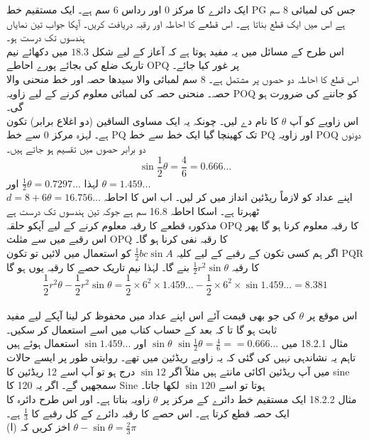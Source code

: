 ایک دائرے کا مرکز 0 اور رداس 6 سم ہے۔ ایک مستقیم خط
PG
جس کی لمبائی 8 سم ہے اس میں ایک قطع بناتا ہے۔ اس قطعے کا احاطہ اور رقبہ دریافت کریں۔ آپکا جواب تین نمایاں ہندسوں تک درست ہو۔\\
اس طرح کے مسائل میں یہ مفید ہوتا ہے کہ آعاز کے لیے شکل
\(18.3\)
میں دکھائے نیم تاریک ضلع کی بجائے پورے احاطے
OPQ
پر غور کیا جائے۔\\
اس قطع کا احاطہ دو حصوں پر مشتمل ہے۔
8 سم لمبائی والا سیدھا حصہ اور خط منحنی والا حصہ۔ منحنی حصہ کی لمبائی معلوم کرنے کے لیے زاویہ
POQ
کو جاننے کی ضرورت ہو گی۔\\
اس زاویے کو آپ
\(\theta\)
کا نام دے لیں۔ چونکہ یہ ایک مساوی الساقین (دو اغلاع برابر) تکون ہے۔ لہزہ مرکز 0 سے خط 
PQ
تک کھینچا گیا ایک خط سے خط 
PQ
اور زاویہ 
POQ
دونوں دو برابر حصوں میں تقسیم ہو جاتے ہیں۔ 
\[\sin\frac{1}{2}\theta=\frac{4}{6}=0.666...\]
لہذا 
\(\frac{1}{2}\theta=0.7297...\)
اور 
\(\theta=1.459...\)
\\اپنے عداد کو لازماً ریڈئین انداز میں کر لیں۔ 
اب اس کا احاطہ 
\(d=8+6\theta=16.756...\)
ٹھہرتا ہے۔ 
اسکا احاطہ 16.8 سم ہے جوکہ تین ہندسوں تک درست ہے\\
مذکورہ قطعے کا رقبہ معلوم کرنے کے لیے آپکو حلقہ 
OPQ
کا رقبہ معلوم کرنا ہو گا 
پھر اس رقبے میں سے مثلث 
OPQ
کا رقبہ نفی کرنا ہو گا۔ \\
اگر ہم کسی تکون کے رقبے کے لیے کلیہ 
\(\frac{1}{2}bc\sin A\)
کو استعمال میں لائیں تو تکون 
PQR
کا رقبہ 
\(\frac{1}{2}r^2\sin\theta\)
بنے گا۔ لہٰذا نیم تاریک حصے کا رقبہ یوں ہو گا 
\[\frac{1}{2}r^2\theta-\frac{1}{2}r^2\sin\theta=\frac{1}{2}\times6^2\times1.459...-\frac{1}{2}\times6^2\times\sin1.459...=8.381\]\\
اس موقع پر 
\(\theta\)
کی جو بھی قیمت آئے اس اپنے عداد میں محفوظ کر لینا آپکے لیے مفید ثابت ہو گا تا کہ بعد کے حساب کتاب میں اسے استعمال کر سکیں۔ \\
مثال 18.2.1 میں 
\(\sin\frac{1}{2}\theta=\frac{4}{6}==0.666...\)
\(\sin\theta\)
اور 
\(\sin1.459...\)
استعمال ہوئے ہیں تاہم یہ نشاندہی نہیں کی گئی کہ یہ زاویے ریڈئین میں تھے۔ روایتی طور پر ایسے حالات میں آپ ریڈئین اکائی مانتے ہیں مثلاً اگر 
\(\sin12\)
درج ہو تو آپ اسے 12 ریڈئین کا 
sine
سمجھیں گے۔ اگر یہ 120 کا 
Sine
ہوتا تو اسے 
\(\sin120\)
لکھا جاتا۔ \\
مثال 18.2.2
ایک مستقیم خط دائرے کے مرکز پر 
\(\theta\)
زاویہ بناتا ہے۔ اور اس طرح دائرہ کا ایک حصہ قطع کرتا ہے۔ اس حصے کا رقبہ دائرے کے کل رقبے کا 
\(\frac{1}{3}\)
ہے۔ \\
(ا) اخز کریں کہ 
\(\theta-\sin\theta=\frac{2}{3}\pi\)\\
